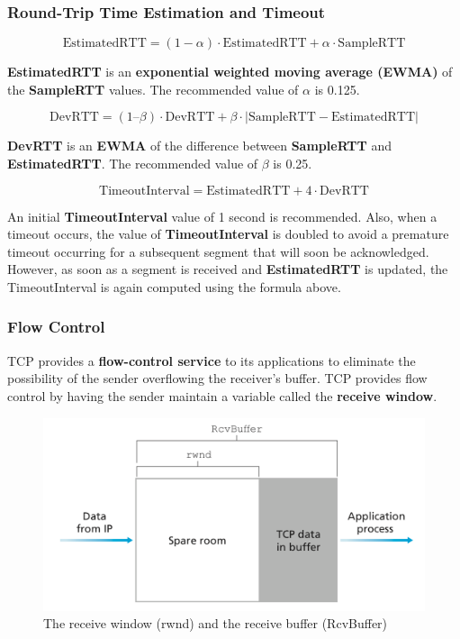 \documentclass[11pt]{article}
\begin{document}
\subsubsection{Round-Trip Time Estimation and Timeout}

\[
	\mathrm{EstimatedRTT} = (1 - \alpha) \cdot \mathrm{EstimatedRTT} + \alpha \cdot \mathrm{SampleRTT}
\]

\textbf{EstimatedRTT} is an \textbf{exponential weighted moving average (EWMA)} of the \textbf{SampleRTT} values. The recommended value of $\alpha$ is 0.125.

\[
	\mathrm{DevRTT} = (1– \beta) \cdot \mathrm{DevRTT} + \beta \cdot | \mathrm{SampleRTT} - \mathrm{EstimatedRTT} |
\]

\textbf{DevRTT} is an \textbf{EWMA} of the difference between \textbf{SampleRTT} and \textbf{EstimatedRTT}. The recommended value of $\beta$ is 0.25.

\[
	\mathrm{TimeoutInterval} = \mathrm{EstimatedRTT} + 4 \cdot \mathrm{DevRTT}
\]

An initial \textbf{TimeoutInterval} value of 1 second is recommended. Also, when a timeout occurs, the value of \textbf{TimeoutInterval} is doubled to avoid a premature timeout occurring for a subsequent segment that will soon be acknowledged. However, as soon as a segment is received and \textbf{EstimatedRTT} is updated, the TimeoutInterval is again computed using the formula above.

\subsubsection{Flow Control}

TCP provides a \textbf{flow-control service} to its applications to eliminate the possibility of the sender overflowing the receiver’s buffer. TCP provides flow control by having the sender maintain a variable called the \textbf{receive window}.

\begin{figure}[h]
	\centering
	\includegraphics[width=0.8\linewidth]{images/rwnd.png}
	\caption{The receive window (rwnd) and the receive buffer (RcvBuffer)}
	\label{fig:rwnd}
\end{figure}
\end{document}
